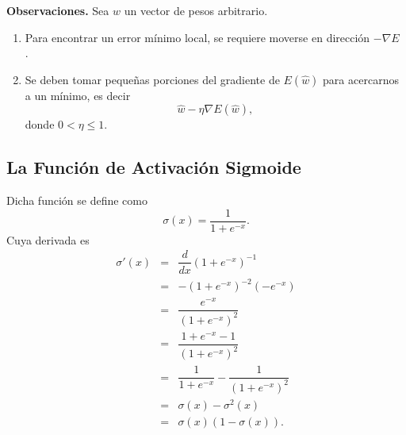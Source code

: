 \documentclass[11pt,letterpaper]{article}
\theoremstyle{definition}
\theoremstyle{definition}
\theoremstyle{definition}
\theoremstyle{definition}
\theoremstyle{definition}
\theoremstyle{definition}
\theoremstyle{definition}
\theoremstyle{definition}
\begin{document}
\textbf{Observaciones. }Sea $\hat{w} $ un vector de pesos arbitrario.
\begin{enumerate}
	\item Para encontrar un error m\'i­nimo local, se requiere moverse en direcci\'on $ -\nabla E $ .
	\item Se deben tomar pequeñas porciones del gradiente de $ E(\hat{w}) $ para acercarnos a un m\'i­nimo, es decir
	\[ \hat{w}-\eta \nabla E(\hat{w}), \]
	donde $ 0< \eta  \leq 1 $.
\end{enumerate}
\begin{center}
\end{center}
\subsection{ La Función de Activación Sigmoide}	
Dicha función se define como
\begin{equation}
	\sigma(x)=\dfrac{1}{1+e^{-x}}.
\end{equation}
Cuya derivada es
\begin{eqnarray*}
	\sigma'(x)&=&\dfrac{d}{dx}(1+e^{-x})^{-1}\\
	&=&-(1+e^{-x})^{-2}(-e^{-x})\\
	&=&\dfrac{e^{-x}}{(1+e^{-x})^{2}}\\
	&=&\dfrac{1+e^{-x}-1}{(1+e^{-x})^{2}}\\
	&=&\dfrac{1}{1+e^{-x}}-\dfrac{1}{(1+e^{-x})^{2}}\\
	&=&\sigma(x)-\sigma^{2}(x)\\
	&=&\sigma(x)(1-\sigma(x)).
\end{eqnarray*}
\end{document}
